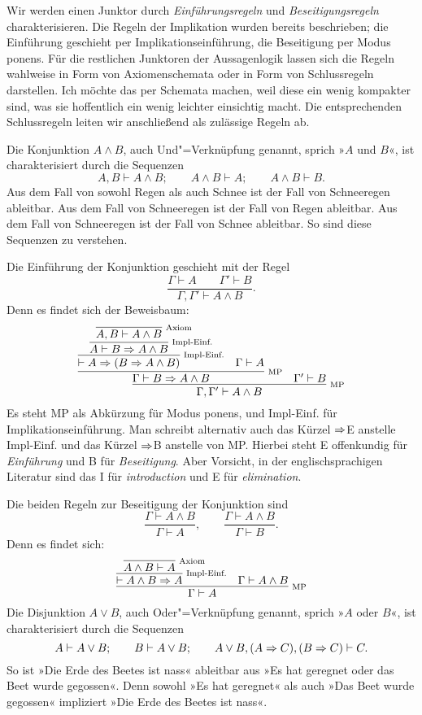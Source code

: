 Wir werden einen Junktor durch \emph{Einführungsregeln}%
 und
\emph{Beseitigungsregeln}
charakterisieren. Die Regeln der Implikation
wurden bereits beschrieben; die Einführung geschieht per
Implikationseinführung, die Beseitigung per Modus ponens.
Für die restlichen Junktoren der Aussagenlogik lassen sich die Regeln
wahlweise in Form von Axiomenschemata oder in Form von Schlussregeln
darstellen. Ich möchte das per Schemata machen, weil diese ein wenig
kompakter sind, was sie hoffentlich ein wenig leichter einsichtig macht.
Die entsprechenden Schlussregeln leiten wir anschließend als zulässige
Regeln ab.

Die Konjunktion $A\land B$, auch Und"=Verknüpfung
genannt, sprich »$A$ und $B$«, ist charakterisiert durch die Sequenzen
\[A,B\vdash A\land B;\qquad A\land B\vdash A;\qquad A\land B\vdash B.\]
Aus dem Fall von sowohl Regen als auch Schnee ist der Fall von
Schneeregen ableitbar. Aus dem Fall von Schneeregen ist der Fall
von Regen ableitbar. Aus dem Fall von Schneeregen ist der Fall
von Schnee ableitbar. So sind diese Sequenzen zu verstehen.

Die Einführung der Konjunktion geschieht mit der Regel
\[\dfrac{\Gamma\vdash A\qquad\Gamma'\vdash B}{\Gamma,\Gamma'\vdash A\land B}.\]
Denn es findet sich der Beweisbaum:
\[
\infer[\infernote{MP}]{\Gamma,\Gamma'\vdash A\land B}{
  \infer[\infernote{MP}]{\Gamma\vdash B\cond A\land B}{
    \infer[\infernote{Impl-Einf.}]{\vdash A\cond (B\cond A\land B)}{
      \infer[\infernote{Impl-Einf.}]{A\vdash B\cond A\land B}{
        \infer[\infernote{Axiom}]{A,B\vdash A\land B}{}}}
  & \Gamma\vdash A}
& \Gamma'\vdash B}
\]
Es steht MP als Abkürzung für Modus ponens, und Impl-Einf. für
Implikationseinführung. Man schreibt alternativ auch das Kürzel
$\Rightarrow$E anstelle Impl-Einf. und das Kürzel $\Rightarrow$B anstelle
von MP. Hierbei steht E offenkundig für \emph{Einführung} und
B für \emph{Beseitigung}. Aber Vorsicht, in der englischsprachigen
Literatur sind das I für \emph{introduction} und E für
\emph{elimination}.

Die beiden Regeln zur Beseitigung der Konjunktion sind
\[\dfrac{\Gamma\vdash A\land B}{\Gamma\vdash A},
\qquad\dfrac{\Gamma\vdash A\land B}{\Gamma\vdash B}.\]
Denn es findet sich:
\[
\infer[\infernote{MP}]{\Gamma\vdash A}{
  \infer[\infernote{Impl-Einf.}]{\vdash A\land B\cond A}{
    \infer[\infernote{Axiom}]{A\land B\vdash A}{}}
& \Gamma\vdash A\land B}
\]
Die Disjunktion $A\lor B$, auch Oder"=Verknüpfung
genannt, sprich »$A$ oder $B$«, ist charakterisiert durch die Sequenzen
\[A\vdash A\lor B;\qquad B\vdash A\lor B;\qquad
A\lor B, (A\Rightarrow C), (B\Rightarrow C)\vdash C.\]
So ist »Die Erde des Beetes ist nass« ableitbar aus »Es hat geregnet
oder das Beet wurde gegossen«. Denn sowohl »Es hat geregnet« als auch
»Das Beet wurde gegossen« impliziert »Die Erde des Beetes ist nass«.

